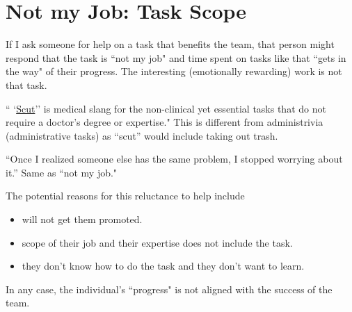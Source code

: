 \section{Not my Job: Task Scope}


If I ask someone for help on a task that benefits the team, that person might respond that the task is ``not my job" and time spent on tasks like that ``gets in the way" of their progress. The interesting (emotionally rewarding) work is not that task.

`` `\href{https://www.urbandictionary.com/define.php?term=scut}{Scut}'' is medical slang for the non-clinical yet essential tasks that do not require a doctor's degree or expertise."
This is different from administrivia (administrative tasks) as ``scut'' would include taking out trash. 


``Once I realized someone else has the same problem, I stopped worrying about it.'' Same as ``not my job."

The potential reasons for this reluctance to help include
\begin{itemize}
    \item will not get them promoted.
    \item scope of their job and their expertise does not include the task.
    \item they don't know how to do the task and they don't want to learn.
\end{itemize}
In any case, the individual's ``progress" is not aligned with the success of the team.